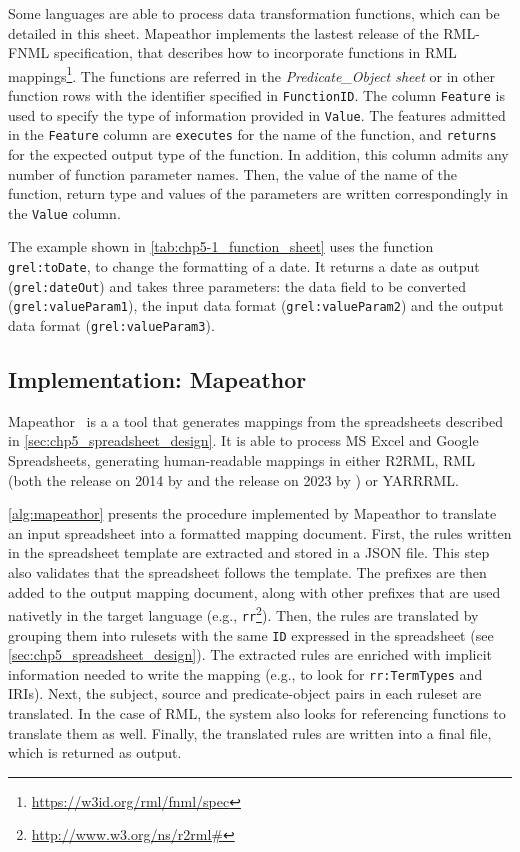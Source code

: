 Some languages are able to process data transformation functions, which can be detailed in this sheet. Mapeathor implements the lastest release of the RML-FNML specification, that describes how to incorporate functions in RML mappings\footnote{\url{https://w3id.org/rml/fnml/spec}}. The functions are referred in the \textit{Predicate\_Object sheet} or in other function rows with the identifier specified in \texttt{FunctionID}. The column \texttt{Feature} is used to specify the type of information provided in \texttt{Value}. The features admitted in the \texttt{Feature} column are \texttt{executes} for the name of the function, and \texttt{returns} for the expected output type of the function. In addition, this column admits any number of function parameter names. Then, the value of the name of the function, return type and values of the parameters are written correspondingly in the \texttt{Value} column.

The example shown in \cref{tab:chp5-1_function_sheet} uses the function \texttt{grel:toDate}, to change the formatting of a date. It returns a date as output (\texttt{grel:dateOut}) and takes three parameters: the data field to be converted (\texttt{grel:valueParam1}), the input data format (\texttt{grel:valueParam2}) and the output data format (\texttt{grel:valueParam3}).




\subsection{Implementation: Mapeathor}
\label{sec:chp5_mapeathor_tool}

Mapeathor~\parencite{iglesias-molina_2023_5973906} is a a tool that generates mappings from the spreadsheets described in \cref{sec:chp5_spreadsheet_design}. It is able to process MS Excel and Google Spreadsheets, generating human-readable mappings in either R2RML, RML (both the release on 2014 by \cite{Dimou2014rml} and the release on 2023 by \cite{iglesias2023rml}) or YARRRML. 

\cref{alg:mapeathor} presents the procedure implemented by Mapeathor to translate an input spreadsheet into a formatted mapping document. First, the rules written in the spreadsheet template are extracted and stored in a JSON file. This step also validates that the spreadsheet follows the template. The prefixes are then added to the output mapping document, along with other prefixes that are used nativetly in the target language (e.g., \texttt{rr}\footnote{\url{http://www.w3.org/ns/r2rml\#}}). Then, the rules are translated by grouping them into rulesets with the same \texttt{ID} expressed in the spreadsheet (see \cref{sec:chp5_spreadsheet_design}). The extracted rules are enriched with implicit information needed to write the mapping (e.g., to look for \texttt{rr:TermTypes} and IRIs). Next, the subject, source and predicate-object pairs in each ruleset are translated. In the case of RML, the system also looks for referencing functions to translate them as well. Finally, the translated rules are written into a final file, which is returned as output. 



